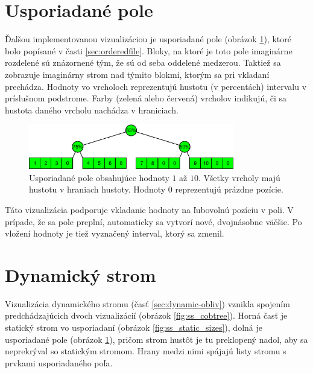 \section{Usporiadané pole}
Ďalšou implementovanou vizualizáciou je usporiadané pole (obrázok \ref{fig:ss_of_overview}), ktoré bolo popísané v časti \ref{sec:orderedfile}. Bloky, na ktoré je toto pole imaginárne rozdelené sú znázornené tým, že sú od seba oddelené medzerou. Taktiež sa zobrazuje imaginárny strom nad týmito blokmi, ktorým sa pri vkladaní prechádza. Hodnoty vo vrcholoch reprezentujú hustotu (v percentách) intervalu v príslušnom podstrome. Farby (zelená alebo červená) vrcholov indikujú, či sa hustota daného vrcholu nachádza v hraniciach.

\begin{figure}
    \centering
    \includegraphics[width=0.8\textwidth]{figures/screenshots/of_overview_3.pdf}
    \caption[Usporiadané pole]{Usporiadané pole obsahujúce hodnoty $1$ až $10$. Všetky vrcholy majú hustotu v hraniach hustoty. Hodnoty $0$ reprezentujú prázdne pozície.}
    \label{fig:ss_of_overview}
\end{figure}

Táto vizualizácia podporuje vkladanie hodnoty na ľubovolnú pozíciu v poli. V prípade, že sa pole preplní, automaticky sa vytvorí nové, dvojnásobne väčšie. Po vložení hodnoty je tiež vyznačený interval, ktorý sa zmenil.

\section{Dynamický strom}
Vizualizácia dynamického stromu (časť \ref{sec:dynamic-obliv}) vznikla spojením predchádzajúcich dvoch vizualizácií (obrázok \ref{fig:ss_cobtree}). Horná časť je statický strom vo  usporiadaní (obrázok \ref{fig:ss_static_sizes}), dolná je usporiadané pole (obrázok \ref{fig:ss_of_overview}), pričom strom hustôt je tu preklopený nadol, aby sa neprekrýval so statickým stromom. Hrany medzi nimi spájajú listy stromu s prvkami usporiadaného poľa. 

